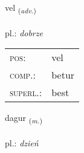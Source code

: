 \documentclass[frontgrid, backgrid]{flacards}\usepackage[]{graphicx}\usepackage[]{xcolor}
\begin{document}
\renewcommand{\blhead}{\vskip5pt {\small\bfseries\footnotesize Atviksorð | przysłówek }}
\renewcommand{\bcfoot}{\vskip5pt \hspace{2pt}{\small\bfseries\footnotesize 1K}}


{vel \small{\textsubscript{(\textit{adv.})}} \\[1ex] %
\textphonetic{[vɛːl]} \\
pl.: \emph{dobrze} \\  [2ex]
\renewcommand*{\arraystretch}{0.8}
\begin{tabular}{ll}
\textsc{pos}: & vel \\ 
\textsc{comp.}: & betur \\ 
\textsc{superl.}: & best \\
\end{tabular}
}

\renewcommand{\flhead}{\vskip5pt \fboxsep=0pt {\small\bfseries\footnotesize Nafnorð | rzeczownik}}
\renewcommand{\fcfoot}{\vskip5pt \fboxsep=0pt \hspace{2pt}{\small\bfseries\footnotesize 1K}}

\renewcommand{\blhead}{\vskip5pt {\small\bfseries\footnotesize Nafnorð | rzeczownik }}
\renewcommand{\bcfoot}{\vskip5pt \hspace{2pt}{\small\bfseries\footnotesize 1K}}


{dagur \small{\textsubscript{(\textit{m.})}} \\[1ex] %
\textphonetic{[taːɣʏr]} \\
pl.: \emph{dzień} \\  [2ex]
\renewcommand*{\arraystretch}{0.8}
}


\renewcommand{\flhead}{\vskip5pt \fboxsep=0pt {\small\bfseries\footnotesize Samtenging | przysłówek}}
\renewcommand{\fcfoot}{\vskip5pt \fboxsep=0pt \hspace{2pt}{\small\bfseries\footnotesize 1K}}
\end{document}
